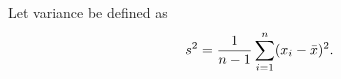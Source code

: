 \documentclass[11pt, oneside]{article}   	%
\begin{document}
\begin{definition}
Let variance be defined as 
$$ s^2 = \frac{1}{n-1} \sum_{i=1}^n (x_i - \bar{x})^2.$$
\end{definition}

%


%
\end{document}
